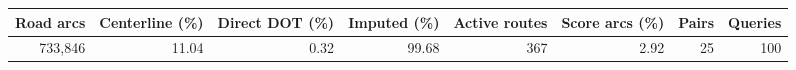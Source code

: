 \begin{tabular}{rrrrrrrr}
\toprule
Road arcs & Centerline (\%) & Direct DOT (\%) & Imputed (\%) & Active routes & Score arcs (\%) & Pairs & Queries \\
\midrule
733,846 & 11.04 & 0.32 & 99.68 & 367 & 2.92 & 25 & 100 \\
\bottomrule
\end{tabular}

